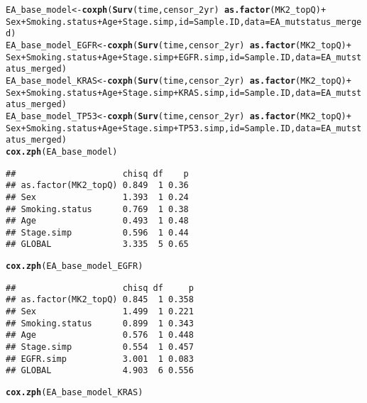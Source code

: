 \documentclass{article}\usepackage[]{graphicx}\usepackage[]{color}
\makeatletter
\newcommand{\hlopt}[1]{\textcolor[rgb]{0,0,0}{#1}}%
\newcommand{\hlstd}[1]{\textcolor[rgb]{0.345,0.345,0.345}{#1}}%
\newcommand{\hlkwb}[1]{\textcolor[rgb]{0.69,0.353,0.396}{#1}}%
\newcommand{\hlkwc}[1]{\textcolor[rgb]{0.333,0.667,0.333}{#1}}%
\newcommand{\hlkwd}[1]{\textcolor[rgb]{0.737,0.353,0.396}{\textbf{#1}}}%
\newenvironment{kframe}{%
 \def\at@end@of@kframe{}%
 \ifinner\ifhmode%
  \def\at@end@of@kframe{\end{minipage}}%
  \begin{minipage}{\columnwidth}%
 \fi\fi%
 \def\FrameCommand##1{\hskip\@totalleftmargin \hskip-\fboxsep
 \colorbox{shadecolor}{##1}\hskip-\fboxsep
     \hskip-\linewidth \hskip-\@totalleftmargin \hskip\columnwidth}%
 \MakeFramed {\advance\hsize-\width
   \@totalleftmargin\z@ \linewidth\hsize
   \@setminipage}}%
 {\par\unskip\endMakeFramed%
 \at@end@of@kframe}
\newenvironment{knitrout}{}{} %
\makeatother
\begin{document}
\begin{knitrout}
\begin{kframe}
\begin{alltt}
\hlstd{EA_base_model} \hlkwb{<-} \hlkwd{coxph}\hlstd{(}\hlkwd{Surv}\hlstd{(time, censor_2yr)} \hlopt{~} \hlkwd{as.factor}\hlstd{(MK2_topQ)}\hlopt{+}
                         \hlstd{Sex}\hlopt{+}\hlstd{Smoking.status}\hlopt{+}\hlstd{Age}\hlopt{+}\hlstd{Stage.simp,} \hlkwc{id}\hlstd{=Sample.ID,} \hlkwc{data}\hlstd{=EA_mutstatus_merged)}
\hlstd{EA_base_model_EGFR} \hlkwb{<-} \hlkwd{coxph}\hlstd{(}\hlkwd{Surv}\hlstd{(time, censor_2yr)} \hlopt{~} \hlkwd{as.factor}\hlstd{(MK2_topQ)}\hlopt{+}
                         \hlstd{Sex}\hlopt{+}\hlstd{Smoking.status}\hlopt{+}\hlstd{Age}\hlopt{+}\hlstd{Stage.simp}\hlopt{+}\hlstd{EGFR.simp,} \hlkwc{id}\hlstd{=Sample.ID,} \hlkwc{data}\hlstd{=EA_mutstatus_merged)}
\hlstd{EA_base_model_KRAS} \hlkwb{<-} \hlkwd{coxph}\hlstd{(}\hlkwd{Surv}\hlstd{(time, censor_2yr)} \hlopt{~} \hlkwd{as.factor}\hlstd{(MK2_topQ)}\hlopt{+}
                         \hlstd{Sex}\hlopt{+}\hlstd{Smoking.status}\hlopt{+}\hlstd{Age}\hlopt{+}\hlstd{Stage.simp}\hlopt{+}\hlstd{KRAS.simp,} \hlkwc{id}\hlstd{=Sample.ID,} \hlkwc{data}\hlstd{=EA_mutstatus_merged)}
\hlstd{EA_base_model_TP53} \hlkwb{<-} \hlkwd{coxph}\hlstd{(}\hlkwd{Surv}\hlstd{(time, censor_2yr)} \hlopt{~} \hlkwd{as.factor}\hlstd{(MK2_topQ)}\hlopt{+}
                         \hlstd{Sex}\hlopt{+}\hlstd{Smoking.status}\hlopt{+}\hlstd{Age}\hlopt{+}\hlstd{Stage.simp}\hlopt{+}\hlstd{TP53.simp,} \hlkwc{id}\hlstd{=Sample.ID,} \hlkwc{data}\hlstd{=EA_mutstatus_merged)}
\hlkwd{cox.zph}\hlstd{(EA_base_model)}
\end{alltt}
\begin{verbatim}
##                     chisq df    p
## as.factor(MK2_topQ) 0.849  1 0.36
## Sex                 1.393  1 0.24
## Smoking.status      0.769  1 0.38
## Age                 0.493  1 0.48
## Stage.simp          0.596  1 0.44
## GLOBAL              3.335  5 0.65
\end{verbatim}
\begin{alltt}
\hlkwd{cox.zph}\hlstd{(EA_base_model_EGFR)}
\end{alltt}
\begin{verbatim}
##                     chisq df     p
## as.factor(MK2_topQ) 0.845  1 0.358
## Sex                 1.499  1 0.221
## Smoking.status      0.899  1 0.343
## Age                 0.576  1 0.448
## Stage.simp          0.554  1 0.457
## EGFR.simp           3.001  1 0.083
## GLOBAL              4.903  6 0.556
\end{verbatim}
\begin{alltt}
\hlkwd{cox.zph}\hlstd{(EA_base_model_KRAS)}
\end{alltt}

\end{kframe}
\end{knitrout}
\end{document}
